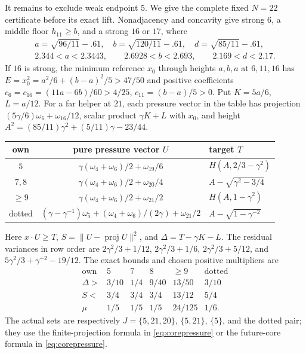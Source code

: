 It remains to exclude weak endpoint $5$. We give the complete fixed
$N=22$ certificate before its exact lift. Nonadjacency and concavity
give strong $6$, a middle floor $h_{11}\ge b$, and a strong $16$
or $17$, where
\[
\begin{gathered}
 a=\sqrt{96/11}-.61,\quad b=\sqrt{120/11}-.61,\quad
 d=\sqrt{85/11}-.61,\\
 2.344<a<2.3443,\qquad 2.6928<b<2.693,\qquad 2.169<d<2.17.
\end{gathered}
\]
If $16$ is strong, the minimum reference $x_0$ through heights
$a,b,a$ at $6,11,16$ has
$E=x_0^2=a^2/6+(b-a)^2/5>47/50$ and positive coefficients
$c_6=c_{16}=(11a-6b)/60>4/25$, $c_{11}=(b-a)/5>0$.
Put $K=5a/6$, $L=a/12$. For a far helper at $21$, each pressure
vector in the table has projection
$(5\gamma/6)\omega_6+\omega_{16}/12$, scalar product
$\gamma K+L$ with $x_0$, and height
$A^2=(85/11)\gamma^2+(5/11)\gamma-23/44$.
\begin{center}\small
\begin{tabular}{ccl}
\toprule
own&pure pressure vector $U$&target $T$\\ \midrule
$5$&$\gamma(\omega_4+\omega_6)/2+\omega_{19}/6$
 &$H(A,2/3-\gamma^2)$\\
$7,8$&$\gamma(\omega_4+\omega_6)/2+\omega_{20}/4$
 &$A-\sqrt{\gamma^2-3/4}$\\
$\ge9$&$\gamma(\omega_4+\omega_6)/2+\omega_{21}/2$
 &$H(A,1-\gamma^2)$\\
dotted&$(\gamma-\gamma^{-1})\omega_5+
 (\omega_4+\omega_6)/(2\gamma)+\omega_{21}/2$
 &$A-\sqrt{1-\gamma^{-2}}$\\ \bottomrule
\end{tabular}\end{center}
Here $x\cdot U\ge T$, $S=\|U-\operatorname{proj}U\|^2$,
and $\Delta=T-\gamma K-L$. The residual variances in row order are
$2\gamma^2/3+1/12$, $2\gamma^2/3+1/6$,
$2\gamma^2/3+5/12$, and $5\gamma^2/3+\gamma^{-2}-19/12$.
The exact bounds and chosen positive multipliers are
\[
\begin{array}{c|ccccc}
\text{own}&5&7&8&\ge9&\text{dotted}\\ \hline
\Delta>&3/10&1/4&9/40&13/50&3/10\\
S<&3/4&3/4&3/4&13/12&5/4\\
\mu&1/5&1/5&1/5&24/125&1/6.
\end{array}
\]
The actual sets are respectively
$J=\{5,21,20\}$, $\{5,21\}$, $\{5\}$, and the dotted pair;
they use the finite-projection formula in \eqref{eq:corepressure} or the future-core formula in \eqref{eq:corepressure}.
